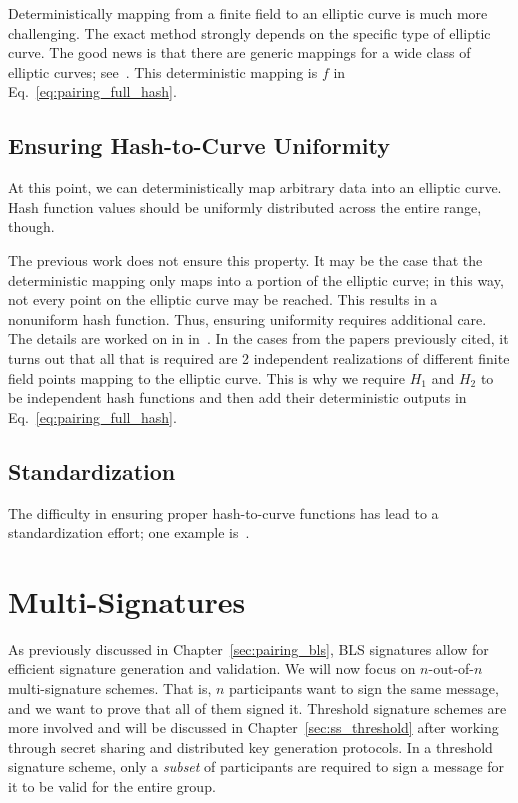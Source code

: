 Deterministically mapping from a \gls{finite field} to an \gls{elliptic curve}
is much more challenging.
The exact method strongly depends on the specific type of \gls{elliptic curve}.
The good news is that there are generic mappings for a wide class
of \glspl{elliptic curve};
see~\cite{brier2010efficient,fouque2012indifferentiable,BonehWahby2019}.
This deterministic mapping is $f$
in Eq.~\eqref{eq:pairing_full_hash}.

\subsection{Ensuring Hash-to-Curve Uniformity}

At this point, we can deterministically map arbitrary data
into an \gls{elliptic curve}.
Hash function values should be uniformly distributed across
the entire range, though.

The previous work does not ensure this property.
It may be the case that the deterministic mapping only maps into
a portion of the \gls{elliptic curve};
in this way, not every point on the \gls{elliptic curve} may be reached.
This results in a nonuniform \gls{hash function}.
Thus, ensuring uniformity requires additional care.
The details are worked on in
in~\cite{brier2010efficient,fouque2012indifferentiable,BonehWahby2019}.
In the cases from the papers previously cited,
it turns out that all that is required are 2 independent
realizations of different \gls{finite field} points mapping
to the \gls{elliptic curve}.
This is why we require $H_{1}$ and $H_{2}$ to be independent
\glspl{hash function}
and then add their deterministic outputs in Eq.~\eqref{eq:pairing_full_hash}.

\subsection{Standardization}

The difficulty in ensuring proper hash-to-curve functions
has lead to a standardization effort;
one example is~\cite{rfc9380}.



\section{Multi-Signatures}

As previously discussed in Chapter~\ref{sec:pairing_bls},
BLS signatures allow for efficient signature generation and validation.
We will now focus on $n$-out-of-$n$ multi-signature schemes.
That is, $n$ participants want to sign the same message,
and we want to prove that all of them signed it.
Threshold signature schemes
are more involved and will be discussed in Chapter~\ref{sec:ss_threshold}
after working through secret sharing and \gls{distributed key generation}
protocols.
In a threshold signature scheme,
only a \emph{subset} of participants are required to sign
a message for it to be valid for the entire group.

